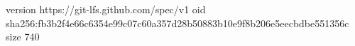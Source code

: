 version https://git-lfs.github.com/spec/v1
oid sha256:fb3b2f4e66c6354e99c07c60a357d28b50883b10e9f8b206e5eecbdbe551356c
size 740
